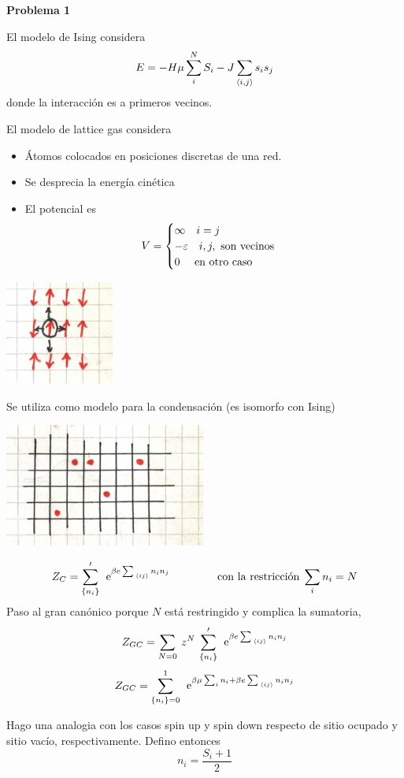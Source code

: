 \documentclass[10pt,oneside]{CBFT_book}
\begin{document}
\begin{ejemplo}{\bf Problema 1}

El modelo de Ising considera 
\[
	E = -H \mu \sum_i^N S_i - J \sum_{\braket{i,j}} s_i s_j
\]
donde la interacción es a primeros vecinos.

El modelo de lattice gas considera
\begin{itemize}
 \item Átomos colocados en posiciones discretas de una red.
 \item Se desprecia la energía cinética
 \item El potencial es
 \[
	V = \begin{cases}
	   \infty \quad i = j \\
	   -\varepsilon \quad i,j, \text{ son vecinos} \\
	   0 \quad \text{ en otro caso}
	    \end{cases}
 \]
\end{itemize}

\includegraphics[scale=0.5]{images/1606337133.jpg}

Se utiliza como modelo para la condensación (es isomorfo con Ising)

\includegraphics[scale=0.5]{images/1606337136.jpg}
 
\[
	Z_C = \sum_{\{ n_i \}}' \: \:\mathrm{e}^{\beta e \sum_{\:\left\langle ij \right\rangle} n_i n_j }
	\qquad \qquad 
	\text{ con la restricción} \; \sum_i n_i = N
\] 
Paso al gran canónico porque $N$ está restringido y complica la sumatoria,
\[
	Z_{GC} = \sum_{N=0} \: z^N \: \sum_{\{ n_i \}}' \: \:\mathrm{e}^{\beta e \sum_{\:\left\langle ij \right\rangle} n_i n_j }
\]
\[
	Z_{GC} = \sum_{\{ n_i \} = 0}^1 \: \:\mathrm{e}^{ \beta \mu \sum_i n_i + \beta e \sum_{\:\left\langle ij \right\rangle} n_i n_j }
\]

Hago una analogia con los casos spin up y spin down respecto de sitio ocupado y sitio vacío,
respectivamente. Defino entonces
\[
	n_i = \frac{ S_i + 1 }{ 2 }
\]


\end{ejemplo}
\end{document}
